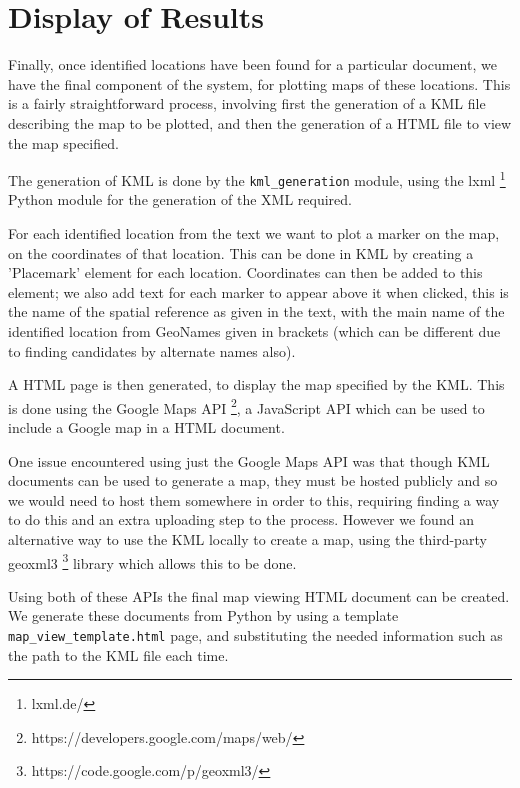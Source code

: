 \documentclass[12pt, a4paper]{report}
\begin{document}
\section{Display of Results}

Finally, once identified locations have been found for a particular document, we have the final component of the system, for plotting maps of these locations. This is a fairly straightforward process, involving first the generation of a KML file describing the map to be plotted, and then the generation of a HTML file to view the map specified.

The generation of KML is done by the \verb#kml_generation# module, using the lxml \footnote{lxml.de/} Python module for the generation of the XML required.

For each identified location from the text we want to plot a marker on the map, on the coordinates of that location. This can be done in KML by creating a 'Placemark' element for each location. Coordinates can then be added to this element; we also add text for each marker to appear above it when clicked, this is the name of the spatial reference as given in the text, with the main name of the identified location from GeoNames given in brackets (which can be different due to finding candidates by alternate names also).

A HTML page is then generated, to display the map specified by the KML. This is done using the Google Maps API \footnote{https://developers.google.com/maps/web/}, a JavaScript API which can be used to include a Google map in a HTML document.

One issue encountered using just the Google Maps API was that though KML documents can be used to generate a map, they must be hosted publicly and so we would need to host them somewhere in order to this, requiring finding a way to do this and an extra uploading step to the process. However we found an alternative way to use the KML locally to create a map, using the third-party geoxml3 \footnote{https://code.google.com/p/geoxml3/} library which allows this to be done.

Using both of these APIs the final map viewing HTML document can be created. We generate these documents from Python by using a template \verb#map_view_template.html# page, and substituting the needed information such as the path to the KML file each time.

\end{document}
